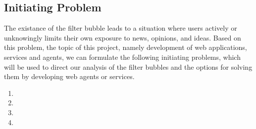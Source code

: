 \subsection*{Initiating Problem} 
The existance of the filter bubble leads to a situation where users actively or
unknowingly limits their own exposure to news, opinions, and ideas. Based on
this problem, the topic of this project, namely development of web applications,
services and agents, we can formulate the following initiating problems,  which
will be used to direct our analysis of the filter bubbles and the options for
solving them by developing web agents or services.


\begin{center}
\begin{minipage}{0.95\linewidth}

\begin{enumerate}
  \item {}
  
  \item {}
  
  \item {}
  
  \item {}
  
\end{enumerate}

\end{minipage}
\end{center}


